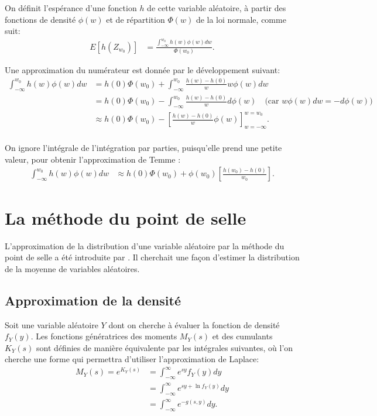 On définit l'espérance d'une fonction $h$ de cette variable aléatoire, 
à partir des fonctions de densité $\phi(w)$ et de répartition
$\Phi(w)$ de la loi normale, comme suit:
\begin{align}
  E[h(Z_{w_0})] &= \frac{\int_{-\infty}^{w_0} h(w)\phi(w)
    dw}{\Phi(w_0)}.
\end{align}

Une approximation du numérateur est donnée par le développement
suivant:
\begin{align*}
  \int_{-\infty}^{w_0} h(w)\phi(w) dw &= h(0)\Phi(w_0)+\int_{-\infty}^{w_0} \frac{h(w)-h(0)}{w} w\phi(w)dw \nonumber\\
  &= h(0)\Phi(w_0)-\int_{-\infty}^{w_0} \frac{h(w)-h(0)}{w} d\phi(w)\quad \mbox{(car }w\phi(w)dw = -d\phi(w) \mbox{)} \nonumber\\
  &\approx h(0)\Phi(w_0) - \left[ \frac{h(w)-h(0)}{w} \phi(w) \right]_{w=-\infty}^{w=w_0}. \nonumber\\
\end{align*}

On ignore l'intégrale de l'intégration par parties, puisqu'elle prend
une petite valeur, pour obtenir l'approximation de Temme :
\begin{align}
  \label{eq:temmeintegrale}
  \int_{-\infty}^{w_0} h(w)\phi(w) dw &\approx h(0)\Phi(w_0) +
  \phi(w_0) \left[ \frac{h(w_0)-h(0)}{w_0} \right].
\end{align}

\section{La méthode du point de selle}
\label{sec:pointcolGAL}

L'approximation de la distribution d'une variable aléatoire par la
méthode du point de selle a été introduite par
\cite{daniels1954saddlepoint}. Il cherchait une façon d'estimer la
distribution de la moyenne de variables aléatoires.

\subsection{Approximation de la densité}
\label{sec:appr-de-prem}

Soit une variable aléatoire $Y$ dont on cherche à évaluer la fonction
de densité $f_Y(y)$. Les fonctions génératrices des moments $M_Y( s)$
et des cumulants $K_Y( s)$ sont définies de manière équivalente par
les intégrales suivantes, où l'on cherche une forme qui permettra
d'utiliser l'approximation de Laplace:
\begin{align}
  M_Y( s) = e^{K_Y( s)} &= \int_{-\infty}^{\infty} e^{ s y} f_Y(y) dy \label{eq:FGMdefinitionsaddle}\\
  &= \int_{-\infty}^{\infty} e^{ s y + \ln{f_Y(y)}} dy \label{eq:FGMdaniels}\\
  &= \int_{-\infty}^{\infty} e^{-g( s,y)} dy.
\end{align}

